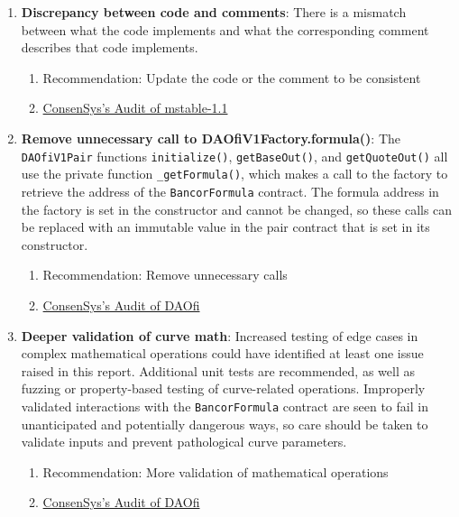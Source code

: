 \begin{enumerate}
\item\textbf{Discrepancy between code and comments}: There is a mismatch between what the code implements and what the corresponding comment describes that code implements.
	\begin{enumerate}
	\item Recommendation: Update the code or the comment to be consistent
	\item\href{https://consensys.net/diligence/audits/2020/07/mstable-1.1/\#discrepancy-between-code-and-comments}{ConsenSys's Audit of mstable-1.1}
	\end{enumerate}

\item\textbf{Remove unnecessary call to DAOfiV1Factory.formula()}: The \verb|DAOfiV1Pair| functions \verb|initialize()|, \verb|getBaseOut()|, and \verb|getQuoteOut()| all use the private function \verb|_getFormula()|, which makes a call to the factory to retrieve the address of the \verb|BancorFormula| contract. The formula address in the factory is set in the constructor and cannot be changed, so these calls can be replaced with an immutable value in the pair contract that is set in its constructor.
	\begin{enumerate}
	\item Recommendation: Remove unnecessary calls
	\item\href{https://consensys.net/diligence/audits/2021/02/daofi/\#remove-unnecessary-call-to-daofiv1factory-formula}{ConsenSys's Audit of DAOfi}
	\end{enumerate}

\item\textbf{Deeper validation of curve math}: Increased testing of edge cases in complex mathematical operations could have identified at least one issue raised in this report. Additional unit tests are recommended, as well as fuzzing or property-based testing of curve-related operations. Improperly validated interactions with the \verb|BancorFormula| contract are seen to fail in unanticipated and potentially dangerous ways, so care should be taken to validate inputs and prevent pathological curve parameters.
	\begin{enumerate}
	\item Recommendation: More validation of mathematical operations
	\item\href{https://consensys.net/diligence/audits/2021/02/daofi/\#deeper-validation-of-curve-math}{ConsenSys's Audit of DAOfi}
	\end{enumerate}


\end{enumerate}
